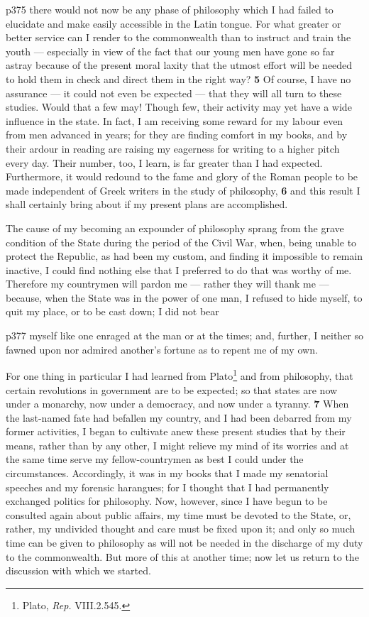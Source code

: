 p375 there would not now be any phase of philosophy which I had failed to elucidate and make easily accessible in the Latin tongue. For what greater or better service can I render to the commonwealth than to instruct and train the youth \texthebrew{—} especially in view of the fact that our young men have gone so far astray because of the present moral laxity that the utmost effort will be needed to hold them in check and direct them in the right way? \textbf{5} Of course, I have no assurance \texthebrew{—} it could not even be expected \texthebrew{—} that they will all turn to these studies. Would that a few may! Though few, their activity may yet have a wide influence in the state. In fact, I am receiving some reward for my labour even from men advanced in years; for they are finding comfort in my books, and by their ardour in reading are raising my eagerness for writing to a higher pitch every day. Their number, too, I learn, is far greater than I had expected. Furthermore, it would redound to the fame and glory of the Roman people to be made independent of Greek writers in the study of philosophy, \textbf{6} and this result I shall certainly bring about if my present plans are accomplished.

The cause of my becoming an expounder of philosophy sprang from the grave condition of the State during the period of the Civil War, when, being unable to protect the Republic, as had been my custom, and finding it impossible to remain inactive, I could find nothing else that I preferred to do that was worthy of me. Therefore my countrymen will pardon me \texthebrew{—} rather they will thank me \texthebrew{—} because, when the State was in the power of one man, I refused to hide myself, to quit my place, or to be cast down; I did not bear

p377 myself like one enraged at the man or at the times; and, further, I neither so fawned upon nor admired another's fortune as to repent me of my own.

For one thing in particular I had learned from Plato\texthebrew{}\footnote{Plato, \emph{Rep.} VIII.2.545.

} and from philosophy, that certain revolutions in government are to be expected; so that states are now under a monarchy, now under a democracy, and now under a tyranny. \textbf{7} When the last-named fate had befallen my country, and I had been debarred from my former activities, I began to cultivate anew these present studies that by their means, rather than by any other, I might relieve my mind of its worries and at the same time serve my fellow-countrymen as best I could under the circumstances. Accordingly, it was in my books that I made my senatorial speeches and my forensic harangues; for I thought that I had permanently exchanged politics for philosophy. Now, however, since I have begun to be consulted again about public affairs, my time must be devoted to the State, or, rather, my undivided thought and care must be fixed upon it; and only so much time can be given to philosophy as will not be needed in the discharge of my duty to the commonwealth. But more of this at another time; now let us return to the discussion with which we started.

